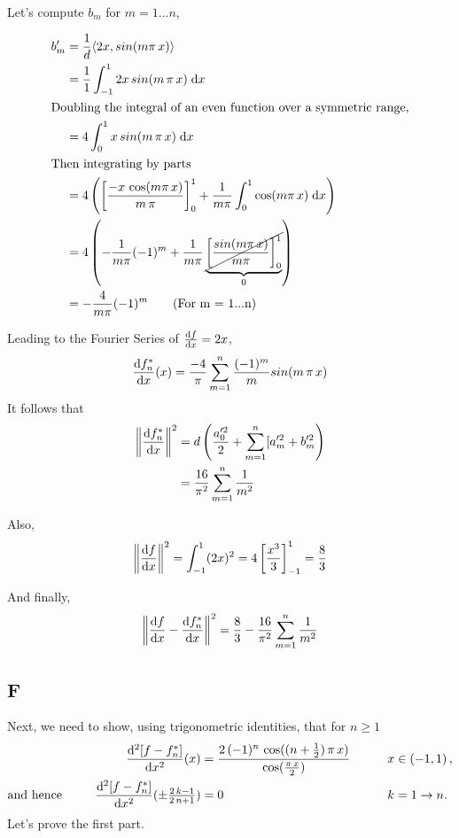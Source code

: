 \documentclass[12pt]{article}
\newcommand{\dx}{\; {\rm d}x}
\newcommand{\dfdx}{\frac{{\rm d}f}{{\rm d}x}}
\newcommand{\dfstardx}{\frac{{\rm d}f_n^*}{{\rm d}x}}
\newcommand{\ddx}[2]{\frac{{\rm d}^#1#2}{{\rm d}x^#1}}
\newcommand{\inprod}[2]{\langle #1, #2 \rangle}
\newcommand{\norm}[1]{\left\|#1\right\|}
\newcommand{\integ}[1]{\int_{-#1}^#1}
\newcommand{\intzero}[1]{\int_{0}^#1}
\begin{document}
Let's compute $b_m$ for $m = 1...n$,

\begin{align}
	b_m' &= \frac{1}{d}\inprod{2x}{sin(m\pi\,x)}\\
		&= \frac{1}{1} \integ{1} 2x\,sin(m\,\pi\,x) \dx\\
	 	\intertext{Doubling the integral of an even function over a symmetric range,}
	 	&= 4 \intzero{1} x\,sin(m\,\pi\,x) \dx\\
	 	\intertext{Then integrating by parts}
	 	&= 4 \left(\left[\frac{-x\,\cos(m\pi\,x)}{m\,\pi}\right]_0^1 +
	 					 \frac{1}{m\pi} \intzero{1} \cos(m\pi\,x) \dx\right)\\
	 	&= 4 \left(-\frac{1}{m\pi}(-1)^m + \frac{1}{m\pi}\underbrace{\cancel{\left[\frac{sin(m\pi\,x)}{m\pi}\right]_0^1}}_{0}\right)\\
	 	&= -\frac{4}{m\pi} (-1)^m \tag{For m = 1...n}
\end{align}


Leading to the Fourier Series of $\dfdx = 2x$, 
\begin{align}
	\dfstardx (x) = \frac{-4}{\pi}\sum_{m=1}^n
			\frac{(-1)^m}{m} sin(m\,\pi\,x) 
\end{align}
It follows that
\begin{align}
	\norm{\dfstardx}^2 &= d\left(\frac{a_0'^2}{2} + \sum_{m=1}^n [a_m'^2 + b_m'^2\right)\\
		&= \frac{16}{\pi^2}\sum_{m=1}^n \frac{1}{m^2}
\end{align}

Also,
\begin{align}
	\norm{\dfdx}^2 = \integ{1} (2x)^2 = 4 \left[\frac{x^3}{3}\right]_{-1}^1 =  \frac{8}{3}
\end{align}

And finally,
\begin{align}
	\left\| \dfdx - \dfstardx \right\|^2 = \frac{8}{3} - \frac{16}{\pi^2}\sum_{m=1}^n \frac{1}{m^2}
\end{align}
\subsection{F}
Next, we need to show, using trigonometric identities, that for $n \geq 1$
\begin{alignat*}{2}
\ddx{2}{[f-f_{n}^*]}(x) & =\frac{2\,(-1)^n\,\cos((n+\frac{1}{2})\,\pi\,x)}
{\cos(\frac{\pi\,x}{2})} \qquad && x \in (-1,1) \,,\\
\text{and hence }\ \qquad \ddx{2}{[f-f_{n}^*]} (\pm \textstyle
\frac{2\,k-1}{2\,n+1}) & =0 \quad && k=1 \rightarrow n.
\end{alignat*}
Let's prove the first part.
\end{document}

